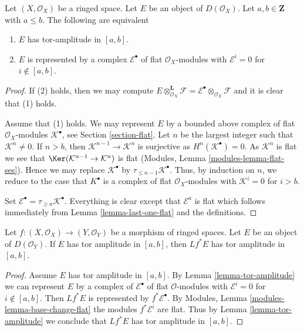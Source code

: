 \begin{lemma}
\label{lemma-tor-amplitude}
Let $(X, \mathcal{O}_X)$ be a ringed space.
Let $E$ be an object of $D(\mathcal{O}_X)$.
Let $a, b \in \mathbf{Z}$ with $a \leq b$. The following are equivalent
\begin{enumerate}
\item $E$ has tor-amplitude in $[a, b]$.
\item $E$ is represented by a complex
$\mathcal{E}^\bullet$ of flat $\mathcal{O}_X$-modules with
$\mathcal{E}^i = 0$ for $i \not \in [a, b]$.
\end{enumerate}
\end{lemma}

\begin{proof}
If (2) holds, then we may compute
$E \otimes_{\mathcal{O}_X}^\mathbf{L} \mathcal{F} =
\mathcal{E}^\bullet \otimes_{\mathcal{O}_X} \mathcal{F}$
and it is clear that (1) holds.

\medskip\noindent
Assume that (1) holds. We may represent $E$ by a bounded above complex
of flat $\mathcal{O}_X$-modules $\mathcal{K}^\bullet$, see
Section \ref{section-flat}.
Let $n$ be the largest integer such that $\mathcal{K}^n \not = 0$.
If $n > b$, then $\mathcal{K}^{n - 1} \to \mathcal{K}^n$ is surjective as
$H^n(\mathcal{K}^\bullet) = 0$. As $\mathcal{K}^n$ is flat we see that
$\Ker(\mathcal{K}^{n - 1} \to \mathcal{K}^n)$ is flat
(Modules, Lemma \ref{modules-lemma-flat-ses}).
Hence we may replace $\mathcal{K}^\bullet$ by
$\tau_{\leq n - 1}\mathcal{K}^\bullet$. Thus, by induction on $n$, we
reduce to the case that $K^\bullet$ is a complex of flat
$\mathcal{O}_X$-modules with $\mathcal{K}^i = 0$ for $i > b$.

\medskip\noindent
Set $\mathcal{E}^\bullet = \tau_{\geq a}\mathcal{K}^\bullet$.
Everything is clear except that $\mathcal{E}^a$ is flat
which follows immediately from Lemma \ref{lemma-last-one-flat}
and the definitions.
\end{proof}

\begin{lemma}
\label{lemma-tor-amplitude-pullback}
Let $f : (X, \mathcal{O}_X) \to (Y, \mathcal{O}_Y)$ be a morphism of ringed
spaces. Let $E$ be an object of $D(\mathcal{O}_Y)$.
If $E$ has tor amplitude in $[a, b]$, then $Lf^*E$ has tor amplitude in
$[a, b]$.
\end{lemma}

\begin{proof}
Assume $E$ has tor amplitude in $[a, b]$. By
Lemma \ref{lemma-tor-amplitude}
we can represent $E$ by a complex of
$\mathcal{E}^\bullet$ of flat $\mathcal{O}$-modules with
$\mathcal{E}^i = 0$ for $i \not \in [a, b]$. Then
$Lf^*E$ is represented by $f^*\mathcal{E}^\bullet$.
By Modules, Lemma \ref{modules-lemma-base-change-flat}
the modules $f^*\mathcal{E}^i$ are flat.
Thus by Lemma \ref{lemma-tor-amplitude}
we conclude that $Lf^*E$ has tor amplitude in $[a, b]$.
\end{proof}

